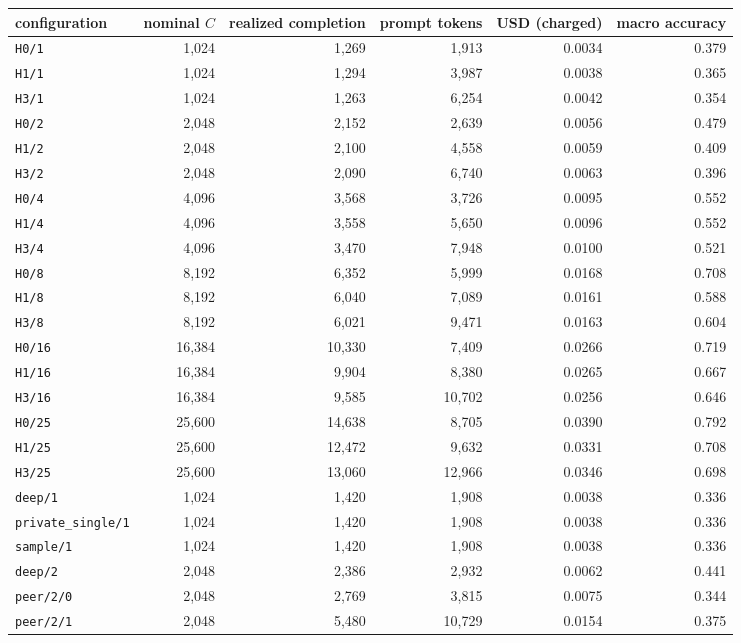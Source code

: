 \begin{tabular}{lrrrrr}
\toprule
configuration & nominal $C$ & realized completion & prompt tokens & USD (charged) & macro accuracy \\ \midrule
\texttt{H0/1} & 1,024 & 1,269 & 1,913 & 0.0034 & 0.379 \\
\texttt{H1/1} & 1,024 & 1,294 & 3,987 & 0.0038 & 0.365 \\
\texttt{H3/1} & 1,024 & 1,263 & 6,254 & 0.0042 & 0.354 \\
\texttt{H0/2} & 2,048 & 2,152 & 2,639 & 0.0056 & 0.479 \\
\texttt{H1/2} & 2,048 & 2,100 & 4,558 & 0.0059 & 0.409 \\
\texttt{H3/2} & 2,048 & 2,090 & 6,740 & 0.0063 & 0.396 \\
\texttt{H0/4} & 4,096 & 3,568 & 3,726 & 0.0095 & 0.552 \\
\texttt{H1/4} & 4,096 & 3,558 & 5,650 & 0.0096 & 0.552 \\
\texttt{H3/4} & 4,096 & 3,470 & 7,948 & 0.0100 & 0.521 \\
\texttt{H0/8} & 8,192 & 6,352 & 5,999 & 0.0168 & 0.708 \\
\texttt{H1/8} & 8,192 & 6,040 & 7,089 & 0.0161 & 0.588 \\
\texttt{H3/8} & 8,192 & 6,021 & 9,471 & 0.0163 & 0.604 \\
\texttt{H0/16} & 16,384 & 10,330 & 7,409 & 0.0266 & 0.719 \\
\texttt{H1/16} & 16,384 & 9,904 & 8,380 & 0.0265 & 0.667 \\
\texttt{H3/16} & 16,384 & 9,585 & 10,702 & 0.0256 & 0.646 \\
\texttt{H0/25} & 25,600 & 14,638 & 8,705 & 0.0390 & 0.792 \\
\texttt{H1/25} & 25,600 & 12,472 & 9,632 & 0.0331 & 0.708 \\
\texttt{H3/25} & 25,600 & 13,060 & 12,966 & 0.0346 & 0.698 \\
\texttt{deep/1} & 1,024 & 1,420 & 1,908 & 0.0038 & 0.336 \\
\texttt{private\_single/1} & 1,024 & 1,420 & 1,908 & 0.0038 & 0.336 \\
\texttt{sample/1} & 1,024 & 1,420 & 1,908 & 0.0038 & 0.336 \\
\texttt{deep/2} & 2,048 & 2,386 & 2,932 & 0.0062 & 0.441 \\
\texttt{peer/2/0} & 2,048 & 2,769 & 3,815 & 0.0075 & 0.344 \\
\texttt{peer/2/1} & 2,048 & 5,480 & 10,729 & 0.0154 & 0.375 \\

\end{tabular}
